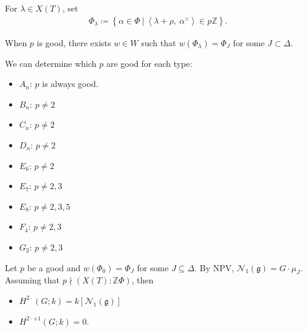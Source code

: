For \(\lambda\in X(T)\), set
\begin{align*}  
\Phi_\lambda \coloneqq\left\{{ \alpha\in\Phi {~\mathrel{\Big|}~}{\left\langle {\lambda+\rho},~{\alpha^\vee} \right\rangle} \in p{\mathbb{Z}}}\right\}
.\end{align*}

When \(p\) is good, there exists \(w\in W\) such that
\(w(\Phi_\lambda) = \Phi_J\) for some \(J \subset\Delta\).


\begin{example}[?]

We can determine which \(p\) are good for each type:

\begin{itemize}
\tightlist
\item
  \(A_n\): \(p\) is always good.
\item
  \(B_n\): \(p\neq 2\)
\item
  \(C_n\): \(p\neq 2\)
\item
  \(D_n\): \(p\neq 2\)
\item
  \(E_6\): \(p\neq 2\)
\item
  \(E_7\): \(p\neq 2, 3\)
\item
  \(E_8\): \(p\neq 2, 3,5\)
\item
  \(F_4\): \(p\neq 2, 3\)
\item
  \(G_2\): \(p\neq 2, 3\)
\end{itemize}

\end{example}

\begin{conjecture}

Let \(p\) be a good and \(w(\Phi_0) = \Phi_J\) for some
\(J \subseteq \Delta\). By NPV,
\(\mathcal{N}_1({\mathfrak{g}}) = G \cdot \mu_J\). Assuming that
\(p\nmid(X(T): {\mathbb{Z}}\Phi)\), then

\begin{itemize}
\tightlist
\item
  \(H^{2\cdot}(G; k) = k[\mathcal{N}_1({\mathfrak{g}})]\)
\item
  \(H^{2\cdot + 1}(G; k) = 0\).
\end{itemize}

\end{conjecture}

